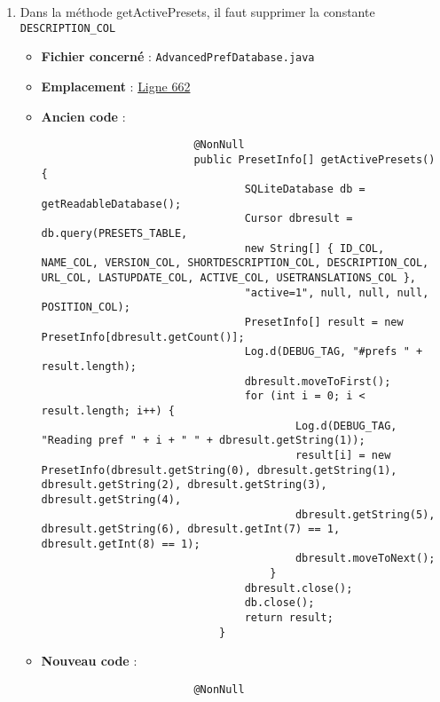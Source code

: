 \begin{enumerate}
    \item Dans la méthode getActivePresets, il faut supprimer la constante \texttt{DESCRIPTION_COL}
          \begin{itemize}
              \item \textbf{Fichier concerné} : \texttt{AdvancedPrefDatabase.java}
              \item \textbf{Emplacement} :
                    \href{https://github.com/MarcusWolschon/osmeditor4android/blob/dcabe8084aa15f5551a37c990516bf73398af1bf/src/main/java/de/blau/android/prefs/AdvancedPrefDatabase.java#L662C25-L662C41}{Ligne 662}
              \item \textbf{Ancien code} :
                    \begin{verbatim}
                        @NonNull
                        public PresetInfo[] getActivePresets() {
                                SQLiteDatabase db = getReadableDatabase();
                                Cursor dbresult = db.query(PRESETS_TABLE,
                                new String[] { ID_COL, NAME_COL, VERSION_COL, SHORTDESCRIPTION_COL, DESCRIPTION_COL, URL_COL, LASTUPDATE_COL, ACTIVE_COL, USETRANSLATIONS_COL },
                                "active=1", null, null, null, POSITION_COL);
                                PresetInfo[] result = new PresetInfo[dbresult.getCount()];
                                Log.d(DEBUG_TAG, "#prefs " + result.length);
                                dbresult.moveToFirst();
                                for (int i = 0; i < result.length; i++) {
                                        Log.d(DEBUG_TAG, "Reading pref " + i + " " + dbresult.getString(1));
                                        result[i] = new PresetInfo(dbresult.getString(0), dbresult.getString(1), dbresult.getString(2), dbresult.getString(3), dbresult.getString(4),
                                        dbresult.getString(5), dbresult.getString(6), dbresult.getInt(7) == 1, dbresult.getInt(8) == 1);
                                        dbresult.moveToNext();
                                    }
                                dbresult.close();
                                db.close();
                                return result;
                            }
                    \end{verbatim}
              \item \textbf{Nouveau code} :
                    \begin{verbatim}
                        @NonNull

\end{verbatim}
\end{itemize}
\end{enumerate}

